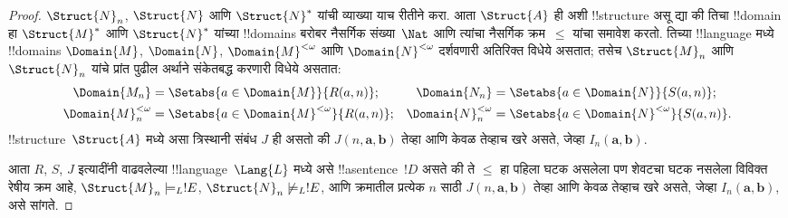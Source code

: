 \documentclass[../../../include/open-logic-section]{subfiles}
\begin{document}
\begin{proof}
$\Struct{N}_n$, $\Struct{N}$ आणि $\Struct{N}^*$ यांची व्याख्या याच
रीतीने करा. आता $\Struct{A}$ ही अशी !!{structure} असू द्या की तिचा
!!{domain} हा $\Struct{M}^*$ आणि $\Struct{N}^*$ यांच्या !!{domain}s
बरोबर नैसर्गिक संख्या~$\Nat$ आणि त्यांचा नैसर्गिक क्रम~$\le$ यांचा
समावेश करतो. तिच्या !!{language} मध्ये !!{domain}s $\Domain{M}$,
$\Domain{N}$, $\Domain{M}^{<\omega}$ आणि $\Domain{N}^{<\omega}$
दर्शवणारी अतिरिक्त विधेये असतात; तसेच $\Struct{M}_n$ आणि
$\Struct{N}_n$ यांचे प्रांत पुढील अर्थाने संकेतबद्ध करणारी विधेये असतात:
\begin{align*}
  \Domain{M_n} & = \Setabs{a \in \Domain{M}}{R(a, n)}; &
  \Domain{N_n} & = \Setabs{a \in \Domain{N}}{S(a,n)}; \\
  \Domain{M}^{<\omega}_n & = \Setabs{a \in \Domain{M}^{<\omega}}{R(a,n)}; &
  \Domain{N}^{<\omega}_n & = \Setabs{a \in \Domain{N}^{<\omega}}{S(a,n)}.
\end{align*}
!!{structure}~$\Struct{A}$ मध्ये असा त्रिस्थानी संबंध $J$ ही असतो की
$J(n, \mathbf{a}, \mathbf{b})$ तेव्हा आणि केवळ तेव्हाच खरे असते,
जेव्हा $I_n(\mathbf{a}, \mathbf{b})$.

आता $R$, $S$, $J$ इत्यादींनी वाढवलेल्या !!{language}~$\Lang{L}$ मध्ये
असे !!a{sentence}~$!D$ असते की ते $\le$ हा पहिला घटक असलेला पण शेवटचा
घटक नसलेला विविक्त रेषीय क्रम आहे, $\Struct{M}_n \models_L !E$,
$\Struct{N}_n \not\models_L !E$, आणि क्रमातील प्रत्येक $n$ साठी
$J(n, \mathbf{a}, \mathbf{b})$ तेव्हा आणि केवळ तेव्हाच खरे असते,
जेव्हा $I_n(\mathbf{a}, \mathbf{b})$, असे सांगते.


\end{proof}
\end{document}

